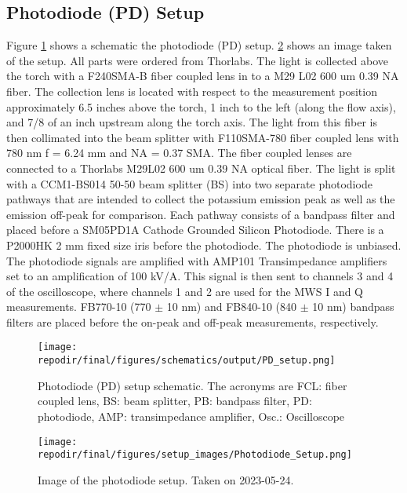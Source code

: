 \subsection{Photodiode (PD) Setup}

Figure \ref{fig:SI_PD_setup_schematic} shows a schematic the photodiode (PD) setup. \ref{fig:SI_PD_setup_image} shows an image taken of the setup. All parts were ordered from Thorlabs. The light is collected above the torch with a F240SMA-B fiber coupled lens in to a M29 L02 600 um 0.39 NA fiber. The collection lens is located with respect to the measurement position approximately 6.5 inches above the torch, 1 inch to the left (along the flow axis), and 7/8 of an inch upstream along the torch axis. The light from this fiber is  then collimated into the beam splitter with F110SMA-780 fiber coupled lens with 780 nm f = 6.24 mm and NA = 0.37 SMA. The fiber coupled lenses are connected to a Thorlabs M29L02 600 um 0.39 NA optical fiber. The light is split with a CCM1-BS014 50-50 beam splitter (BS) into two separate photodiode pathways that are intended to collect the potassium emission peak as well as the emission off-peak for comparison. Each pathway consists of a bandpass filter and placed before a SM05PD1A Cathode Grounded Silicon Photodiode. There is a P2000HK 2 mm fixed size iris before the photodiode. The photodiode is unbiased.   The photodiode signals are amplified with AMP101 Transimpedance amplifiers set to an amplification of 100 kV/A. This signal is then sent to channels 3 and 4 of the oscilloscope, where channels 1 and 2 are used for the MWS  I and Q measurements.  FB770-10 (770 $\pm$ 10 nm) and FB840-10 (840 $\pm$ 10 nm) bandpass filters are placed before the on-peak and off-peak measurements, respectively. 



\begin{figure}[]
    \centering
    \texttt{[image: \\repodir/final/figures/schematics/output/PD\_setup.png]}
    \caption{Photodiode (PD) setup schematic. The acronyms are FCL: fiber coupled lens, BS: beam splitter, PB: bandpass filter, PD: photodiode, AMP: transimpedance amplifier, Osc.: Oscilloscope}
    \label{fig:SI_PD_setup_schematic}
\end{figure}



\begin{figure}[]
    \centering
    \texttt{[image: \\repodir/final/figures/setup\_images/Photodiode\_Setup.png]}
    \caption{Image of the photodiode setup. Taken on 2023-05-24. }
    \label{fig:SI_PD_setup_image}
\end{figure}






